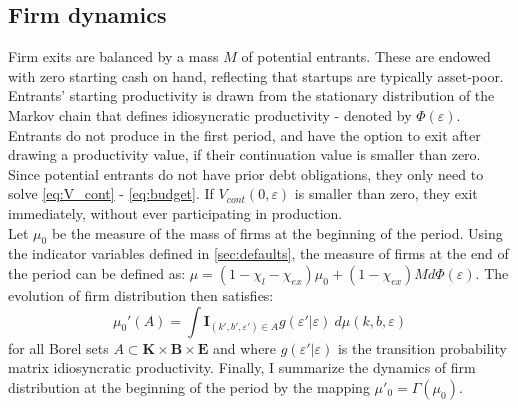 \documentclass[12pt]{article}
\begin{document}
\subsection{Firm dynamics}
Firm exits are balanced by a mass $M$ of potential entrants. These are endowed with zero starting cash on hand, reflecting that startups are typically asset-poor. Entrants' starting productivity is drawn from the stationary distribution of the Markov chain that defines idiosyncratic productivity - denoted by $\Phi(\varepsilon)$. Entrants do not produce in the first period, and have the option to exit after drawing a productivity value, if their continuation value is smaller than zero. Since potential entrants do not have prior debt obligations, they only need to solve \ref{eq:V_cont} - \ref{eq:budget}. If $V_{cont}(0,\varepsilon)$ is smaller than zero, they exit immediately, without ever participating in production. \vspace{3mm} \\
Let $\mu_0$ be the measure of the mass of firms at the beginning of the period. Using the indicator variables defined in \ref{sec:defaults}, the measure of firms at the end of the period can be defined as: $\mu = (1 - \chi_l - \chi_{ex}) \mu_0  + (1 - \chi_{ex}) M d \Phi(\varepsilon) $. The evolution of firm distribution then satisfies:
\begin{equation} \label{eq_firmdim} 
    \mu_{0}'(A) = \int \mathbf{I}_{(k', b', \varepsilon') \in A} g(\varepsilon'|\varepsilon) \ d \mu (k,b,\varepsilon)
\end{equation}
for all Borel sets $A \subset  \mathbf{K} \times \mathbf{B} \times \mathbf{E} $ and where $g(\varepsilon'|\varepsilon)$ is the transition probability matrix idiosyncratic productivity. Finally, I summarize the dynamics of firm distribution at the beginning of the period by the mapping $ \mu'_0 =\Gamma(\mu_0)$.
\end{document}
